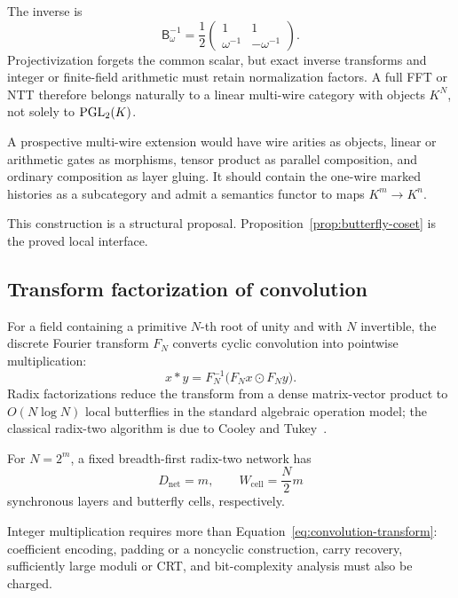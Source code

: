 The inverse is
\[
  \mathsf B_\omega^{-1}
  =\frac12
  \begin{pmatrix}1&1\\\omega^{-1}&-\omega^{-1}\end{pmatrix}.
\]
Projectivization forgets the common scalar, but exact inverse transforms and
integer or finite-field arithmetic must retain normalization factors.  A full
FFT or NTT therefore belongs naturally to a linear multi-wire category with
objects $K^N$, not solely to $\operatorname{PGL}_2(K)$.

\begin{construction}
A prospective multi-wire extension would have wire arities as objects,
linear or arithmetic gates as morphisms, tensor product as parallel
composition, and ordinary composition as layer gluing.  It should contain the
one-wire marked histories as a subcategory and admit a semantics functor to
maps $K^m\to K^n$.
\end{construction}

This construction is a structural proposal.  Proposition~\ref{prop:butterfly-coset}
is the proved local interface.

\subsection{Transform factorization of convolution}

For a field containing a primitive $N$-th root of unity and with $N$ invertible,
the discrete Fourier transform $F_N$ converts cyclic convolution into
pointwise multiplication:
\begin{equation}
  x*y
  =F_N^{-1}\bigl(F_Nx\odot F_Ny\bigr).
  \label{eq:convolution-transform}
\end{equation}
Radix factorizations reduce the transform from a dense matrix-vector product to
$O(N\log N)$ local butterflies in the standard algebraic operation model; the
classical radix-two algorithm is due to Cooley and Tukey~\cite{CooleyTukey1965}.

For $N=2^m$, a fixed breadth-first radix-two network has
\begin{equation}
  D_{\mathrm{net}}=m,
  \qquad
  W_{\mathrm{cell}}=\frac N2m
  \label{eq:radix2-network-counts}
\end{equation}
synchronous layers and butterfly cells, respectively.

Integer multiplication requires more than
Equation~\eqref{eq:convolution-transform}: coefficient encoding, padding or a
noncyclic construction, carry recovery, sufficiently large moduli or CRT, and
bit-complexity analysis must also be charged.

